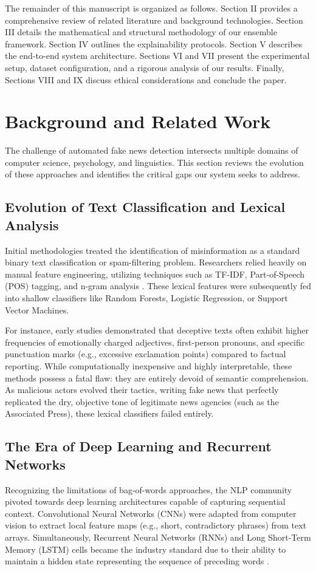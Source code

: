 \documentclass[conference]{IEEEtran}
\begin{document}
The remainder of this manuscript is organized as follows. Section II provides a comprehensive review of related literature and background technologies. Section III details the mathematical and structural methodology of our ensemble framework. Section IV outlines the explainability protocols. Section V describes the end-to-end system architecture. Sections VI and VII present the experimental setup, dataset configuration, and a rigorous analysis of our results. Finally, Sections VIII and IX discuss ethical considerations and conclude the paper.

\section{Background and Related Work}

The challenge of automated fake news detection intersects multiple domains of computer science, psychology, and linguistics. This section reviews the evolution of these approaches and identifies the critical gaps our system seeks to address.

\subsection{Evolution of Text Classification and Lexical Analysis}
Initial methodologies treated the identification of misinformation as a standard binary text classification or spam-filtering problem. Researchers relied heavily on manual feature engineering, utilizing techniques such as TF-IDF, Part-of-Speech (POS) tagging, and n-gram analysis \cite{b5}. These lexical features were subsequently fed into shallow classifiers like Random Forests, Logistic Regression, or Support Vector Machines. 

For instance, early studies demonstrated that deceptive texts often exhibit higher frequencies of emotionally charged adjectives, first-person pronouns, and specific punctuation marks (e.g., excessive exclamation points) compared to factual reporting. While computationally inexpensive and highly interpretable, these methods possess a fatal flaw: they are entirely devoid of semantic comprehension. As malicious actors evolved their tactics, writing fake news that perfectly replicated the dry, objective tone of legitimate news agencies (such as the Associated Press), these lexical classifiers failed entirely.

\subsection{The Era of Deep Learning and Recurrent Networks}
Recognizing the limitations of bag-of-words approaches, the NLP community pivoted towards deep learning architectures capable of capturing sequential context. Convolutional Neural Networks (CNNs) were adapted from computer vision to extract local feature maps (e.g., short, contradictory phrases) from text arrays. Simultaneously, Recurrent Neural Networks (RNNs) and Long Short-Term Memory (LSTM) cells became the industry standard due to their ability to maintain a hidden state representing the sequence of preceding words \cite{b10}.
\end{document}
